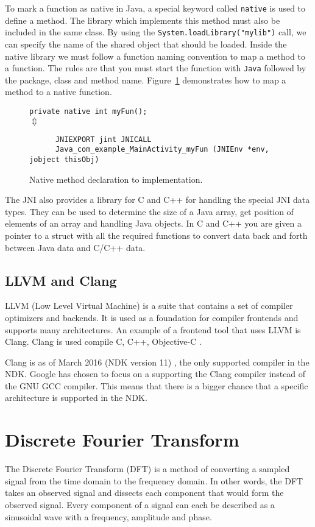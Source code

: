 To mark a function as native in Java, a special keyword called \texttt{native} is used to define a method. The library which implements this method must also be included in the same class. By using the \texttt{System.loadLibrary("mylib")} call, we can specify the name of the shared object that should be loaded. Inside the native library we must follow a function naming convention to map a method to a function. The rules are that you must start the function with \texttt{Java} followed by the package, class and method name. Figure~\ref{fig:native} demonstrates how to map a method to a native function.

\begin{figure}
\begin{center}
    \texttt{private native int myFun();}\\
    $\Updownarrow$
    \begin{verbatim}
      JNIEXPORT jint JNICALL
      Java_com_example_MainActivity_myFun (JNIEnv *env, jobject thisObj)
    \end{verbatim}
\end{center}
\caption{Native method declaration to implementation.}
\label{fig:native}
\end{figure}

The JNI also provides a library for C and C++ for handling the special JNI data types. They can be used to determine the size of a Java array, get position of elements of an array and handling Java objects. In C and C++ you are given a pointer to a struct with all the required functions to convert data back and forth between Java data and C/C++ data.

\subsection{LLVM and Clang}
LLVM (Low Level Virtual Machine) is a suite that contains a set of compiler optimizers and backends. It is used as a foundation for compiler frontends and supports many architectures. An example of a frontend tool that uses LLVM is Clang. Clang is used compile C, C++, Objective-C \cite{clang:comp}.

Clang is as of March 2016 (NDK version 11) \cite{android:ndk:revision}, the only supported compiler in the NDK. Google has chosen to focus on a supporting the Clang compiler instead of the GNU GCC compiler. This means that there is a bigger chance that a specific architecture is supported in the NDK.

\section{Discrete Fourier Transform}
The Discrete Fourier Transform (DFT) is a method of converting a sampled signal from the time domain to the frequency domain. In other words, the DFT takes an observed signal and dissects each component that would form the observed signal. Every component of a signal can each be described as a sinusoidal wave with a frequency, amplitude and phase.

